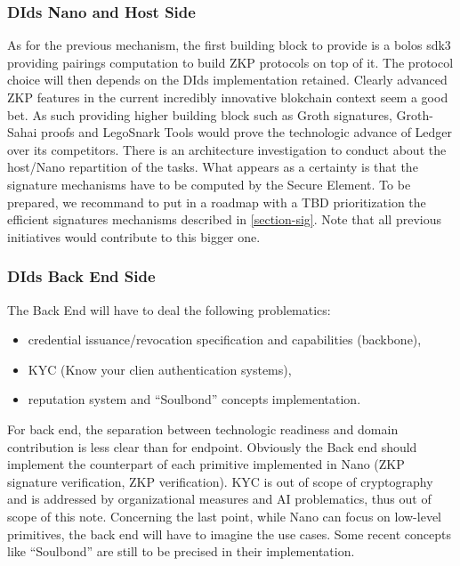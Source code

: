 \documentclass[11pt]{llncs2e/llncs}
\begin{document}
\subsubsection{DIds Nano and Host Side}

As for the previous mechanism, the first building block to provide is a bolos sdk3 providing pairings computation to build ZKP protocols on top of it. The protocol choice will then depends on the DIds implementation retained. Clearly advanced ZKP features in the current incredibly innovative blokchain context seem a good bet. As such providing higher building block such as Groth signatures, Groth-Sahai proofs and LegoSnark Tools would prove the technologic advance of Ledger over its competitors. There is an architecture investigation to conduct about the host/Nano repartition of the tasks. What appears as a certainty is that the signature mechanisms have to be computed by the Secure Element. To be prepared, we recommand to put in a roadmap with a TBD prioritization the efficient signatures mechanisms described in \ref{section-sig}. Note that all previous initiatives would contribute to this bigger one.



\subsubsection{DIds Back End Side}

The Back End will have to deal the following problematics:
\begin{itemize}
 \item credential issuance/revocation specification and capabilities (backbone),
 \item KYC (Know your clien authentication systems),
 \item reputation system and ``Soulbond'' concepts implementation.
\end{itemize}
For back end,  the separation between technologic readiness and domain contribution is less clear than for endpoint. Obviously the Back end should implement the counterpart of each primitive implemented in Nano (ZKP signature verification, ZKP verification). KYC is out of scope of cryptography and is addressed by organizational measures and AI problematics, thus out of scope of this note. Concerning the last point, 
while Nano can focus on low-level primitives, the back end will have to imagine the use cases. Some recent concepts like ``Soulbond'' \cite{Soul} are still to be precised in their implementation.  
\end{document}

